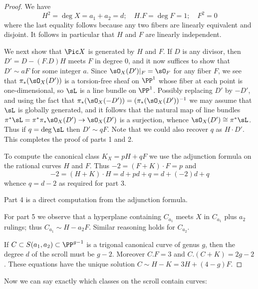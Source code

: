 \begin{proof}
We have 
$$
H^2 = \deg X = a_1+a_2 = d; \quad H.F = \deg F = 1; \quad F^2 = 0
$$
where the last equality follows because any two fibers are linearly equivalent and disjoint.
It follows in particular that $H$ and $F$ are linearly independent.

We next show that $\Pic X$ is generated by $H$ and $F$. If $D$ is any divisor,
then $D' = D - (F.D)H$ meets $F$ in degree 0, and it now suffices to show that $D'\sim aF$ for
some integer $a$.
Since $\sO_X(D')|_F = \sO_F$ for any fiber $F$, we see that
$\pi_*(\sO_X(D'))$ is a torsion-free sheaf on $\PP^1$ whose fiber at each point is one-dimensional, 
so $\sL$ is a line bundle on $\PP^1$.  Possibly replacing $D'$ by $-D'$, and using the fact that
$\pi_*(\sO_X(-D')) = (\pi_*(\sO_X(D'))^{-1}$ we may assume that $\sL$ is globally generated, and it follows that  the natural map of line bundles $\pi^*\sL = \pi^*\pi_* \sO_X(D') \to \sO_X(D') $ is a surjection, whence 
$\sO_X(D') \cong \pi^*\sL$. Thus if $q = \deg \sL$ then
$D' \sim qF$. Note that we could also recover $q$ as $H\cdot D'$. This completes the proof of parts
1 and 2.

To compute the canonical class $K_X = pH+qF$ we use the adjunction formula on the rational curves
$H$ and $F$. Thus $-2 = (F+K)\cdot F = p $ and 
$$
-2 = (H+K)\cdot H = d + pd+q = d + (-2)d+q
$$
whence $q = d-2$ as required for part 3.
 
 Part 4 is a direct computation from the adjunction formula.
 
For part 5 we observe that a hyperplane containing $C_{a_1}$ meets $X$ in $C_{a_1}$ plus
$a_2$ rulings; thus $C_{a_1}\sim H-a_2F$. Similar reasoning holds for $C_{a_{2}}$.

If  $C \subset S(a_{1}, a_{2}) \subset \PP^{g-1}$ is a  trigonal canonical curve of genus $g$, then the degree
$d$ of the scroll must be $g-2$. Moreover $C.F=3$ and $C.(C+K) = 2g-2$. These equations have the unique solution
$C \sim H-K = 3H + (4-g)F.$
\end{proof}

Now we can say exactly which classes on the scroll contain curves:

